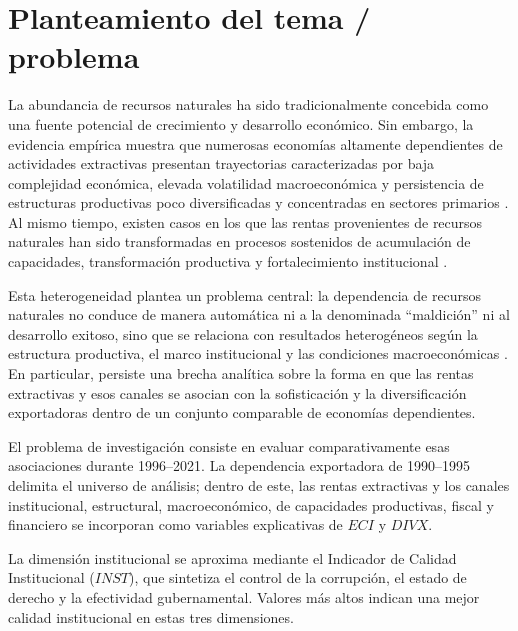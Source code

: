 \documentclass[../../TFM.tex]{subfiles}
\begin{document}

	\chapter{Planteamiento del tema / problema}
	\label{chap:planteamiento}

	La abundancia de recursos naturales ha sido tradicionalmente concebida como una fuente potencial de crecimiento y desarrollo económico. Sin embargo, la evidencia empírica muestra que numerosas economías altamente dependientes de actividades extractivas presentan trayectorias caracterizadas por baja complejidad económica, elevada volatilidad macroeconómica y persistencia de estructuras productivas poco diversificadas y concentradas en sectores primarios \parencite{Tornell1999,Arezki2012}. Al mismo tiempo, existen casos en los que las rentas provenientes de recursos naturales han sido transformadas en procesos sostenidos de acumulación de capacidades, transformación productiva y fortalecimiento institucional \parencite{Ville2013}.

	Esta heterogeneidad plantea un problema central: la dependencia de recursos naturales no conduce de manera automática ni a la denominada ``maldición'' ni al desarrollo exitoso, sino que se relaciona con resultados heterogéneos según la estructura productiva, el marco institucional y las condiciones macroeconómicas \parencite{Lebdioui2019}. En particular, persiste una brecha analítica sobre la forma en que las rentas extractivas y esos canales se asocian con la sofisticación y la diversificación exportadoras dentro de un conjunto comparable de economías dependientes.

	El problema de investigación consiste en evaluar comparativamente esas asociaciones durante 1996--2021. La dependencia exportadora de 1990--1995 delimita el universo de análisis; dentro de este, las rentas extractivas y los canales institucional, estructural, macroeconómico, de capacidades productivas, fiscal y financiero se incorporan como variables explicativas de $ECI$ y $DIVX$.

	La dimensión institucional se aproxima mediante el Indicador de Calidad
	Institucional ($INST$), que sintetiza el control de la corrupción, el estado
	de derecho y la efectividad gubernamental. Valores más altos indican una
	mejor calidad institucional en estas tres dimensiones.
\end{document}
